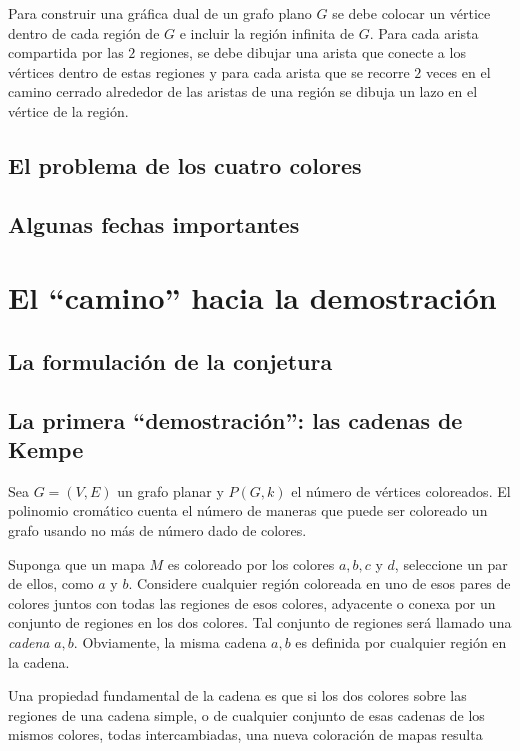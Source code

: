 \documentclass[3p,times,a4paper,twocolumn,authoryear]{elsarticle} %
\begin{document}
\begin{example}
Para construir una gráfica dual de un grafo plano $G$ se debe colocar un vértice dentro de cada región de $G$ e incluir la región infinita de $G$. Para cada arista compartida por las $2$ regiones, se debe dibujar una arista que conecte a los vértices dentro de estas regiones y para cada arista que se recorre $2$ veces en el camino cerrado alrededor de las aristas de una región se dibuja un lazo en el vértice de la región. 
\end{example}

\subsection{El problema de los cuatro colores}

\subsection{Algunas fechas importantes}

\section{El ``camino'' hacia la demostración}

\subsection{La formulación de la conjetura}

\subsection{La primera ``demostración'': las cadenas de Kempe}

\begin{definition}
Sea $G=(V,E)$ un grafo planar y $P(G,k)$ el número de vértices coloreados.
El polinomio cromático cuenta el número de maneras que puede ser coloreado un grafo usando no más de número dado de colores.
\end{definition}

\begin{definition}
Suponga que un mapa $M$ es coloreado por los colores $a, b, c$ y $d$, seleccione un par de ellos, como $a$ y $b$. Considere cualquier región coloreada en uno de esos pares de colores juntos con todas las regiones de esos colores, adyacente o conexa por un conjunto de regiones en los dos colores. Tal conjunto de regiones será llamado una \emph{cadena} $a,b$. Obviamente, la misma cadena $a,b$ es definida por cualquier región en la cadena.

Una propiedad fundamental de la cadena es que si los dos colores sobre las regiones de una cadena simple, o de cualquier conjunto de esas cadenas de los mismos colores, todas intercambiadas, una nueva coloración de mapas resulta
\end{definition}
\end{document}
